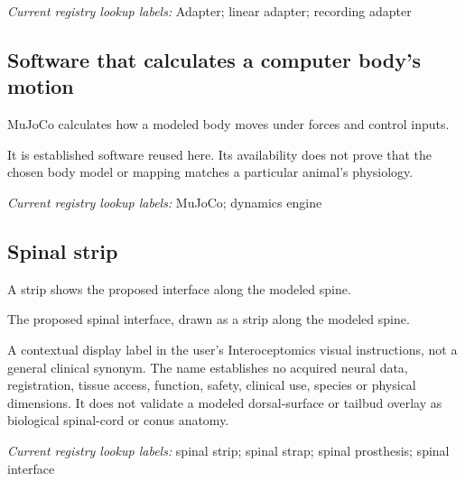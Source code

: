 \noindent\textit{Current registry lookup labels:} Adapter; linear adapter; recording adapter\par

\begin{samepage}
\subsection*{Software that calculates a computer body’s motion}
\noindent MuJoCo calculates how a modeled body moves under forces and control inputs.\par
\end{samepage}
\begin{samepage}
\noindent It is established software reused here. Its availability does not prove that the chosen body model or mapping matches a particular animal’s physiology.\par\nopagebreak[4]

\end{samepage}


\noindent\textit{Current registry lookup labels:} MuJoCo; dynamics engine\par

\subsection*{Spinal strip}
\noindent A strip shows the proposed interface along the modeled spine.\par
\noindent The proposed spinal interface, drawn as a strip along the modeled spine.\par
\noindent A contextual display label in the user's Interoceptomics visual instructions, not a general clinical synonym. The name establishes no acquired neural data, registration, tissue access, function, safety, clinical use, species or physical dimensions. It does not validate a modeled dorsal-surface or tailbud overlay as biological spinal-cord or conus anatomy.\par

\noindent\textit{Current registry lookup labels:} spinal strip; spinal strap; spinal prosthesis; spinal interface\par

